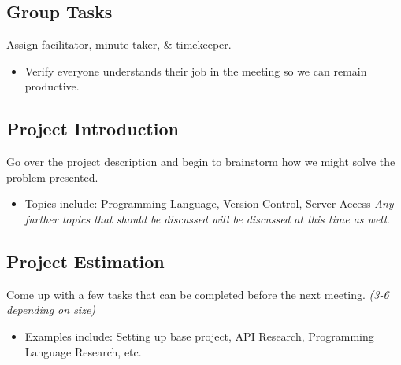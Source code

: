 \subsection{Group Tasks}
    Assign facilitator, minute taker, \& timekeeper. 
    \begin{itemize}
        \item Verify everyone understands their job in the meeting so we can remain productive.
    \end{itemize}
\subsection{Project Introduction}
    Go over the project description and begin to brainstorm how we might solve the problem presented.
    \begin{itemize}
        \item Topics include: Programming Language, Version Control, Server Access \newline
        \textit{Any further topics that should be discussed will be discussed at this time as well.}
    \end{itemize}
\subsection{Project Estimation}
    Come up with a few tasks that can be completed before the next meeting. \textit{(3-6 depending on size)}
    \begin{itemize}
        \item Examples include: Setting up base project, API Research, Programming Language Research, etc.
    \end{itemize}